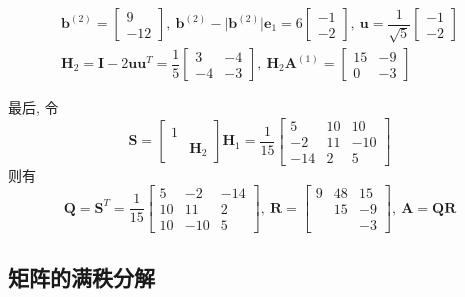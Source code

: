 \begin{gather*}
    \bm{b}^{(2)} = \begin{bmatrix}
        9 \\
        -12
    \end{bmatrix},\ \bm{b}^{(2)} - \lvert \bm{b}^{(2)} \rvert \bm{e}_1 = 6\begin{bmatrix}
        -1 \\
        -2
    \end{bmatrix},\ \bm{u} = \dfrac{1}{\sqrt{5}}\begin{bmatrix}
        -1 \\
        -2
    \end{bmatrix} \\
    \bm{H}_2 = \bm{I} - 2\bm{uu}^T = \dfrac{1}{5} \begin{bmatrix}
        3  & -4 \\
        -4 & -3
    \end{bmatrix},\ \bm{H}_2\bm{A}^{(1)} = \begin{bmatrix}
        15 & -9 \\
        0  & -3
    \end{bmatrix}
\end{gather*}
\par 最后, 令
$$
    \bm{S} = \begin{bmatrix}
        1 &          \\
          & \bm{H}_2
    \end{bmatrix}\bm{H}_1 = \dfrac{1}{15}\begin{bmatrix}
        5   & 10 & 10  \\
        -2  & 11 & -10 \\
        -14 & 2  & 5
    \end{bmatrix}
$$
则有
$$
    \bm{Q} = \bm{S}^T = \dfrac{1}{15}\begin{bmatrix}
        5  & -2  & -14 \\
        10 & 11  & 2   \\
        10 & -10 & 5
    \end{bmatrix},\ \bm{R} = \begin{bmatrix}
        9 & 48 & 15 \\
          & 15 & -9 \\
          &    & -3
    \end{bmatrix},\ \bm{A} = \bm{QR}
$$

\subsection{矩阵的满秩分解}

